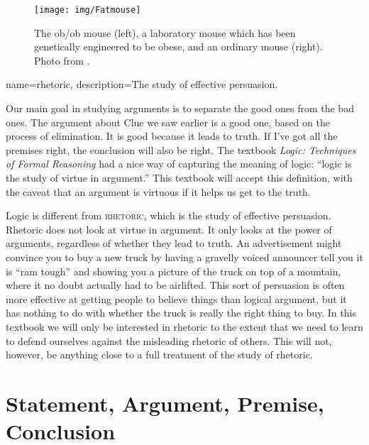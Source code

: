 \begin{figure}
\begin{center}
\texttt{[image: img/Fatmouse]}
\end{center}
\label{fig:ob_ob_mouse}
\caption{The ob/ob mouse (left), a laboratory mouse which has been genetically engineered to be obese, and an ordinary mouse (right). Photo from \citet{WikimediaCommons2006}.}
\end{figure}

{
name=rhetoric,
description={The study of effective persuasion.}
}

Our main goal in studying arguments is to separate the good ones from the bad ones. The argument about Clue we saw earlier is a good one, based on the process of elimination.  It is good because it leads to truth. If I've got all the premises right, the conclusion will also be right. The textbook \textit{Logic: Techniques of Formal Reasoning} \citep{Kalish1980} had a nice way of capturing the meaning of logic: ``logic is the study of virtue in argument.'' \label{virtue_in_argument} This textbook will accept this definition, with the caveat that an argument is virtuous if it helps us get to the truth.

Logic is different from \textsc{\gls{rhetoric}}, which is the study of effective persuasion. Rhetoric does not look at virtue in argument. It only looks at the power of arguments, regardless of whether they lead to truth. An advertisement might convince you to buy a new truck by having a gravelly voiced announcer tell you it is ``ram tough'' and showing you a picture of the truck on top of a mountain, where it no doubt actually had to be airlifted. This sort of persuasion is often more effective at getting people to believe things than logical argument, but it has nothing to do with whether the truck is really the right thing to buy. In this textbook we will only be interested in rhetoric to the extent that we need to learn to defend ourselves against the misleading rhetoric of others. This will not, however, be anything close to a full treatment of the study of rhetoric.



\section{Statement, Argument, Premise, Conclusion}\label{sec:partsofarguments}

